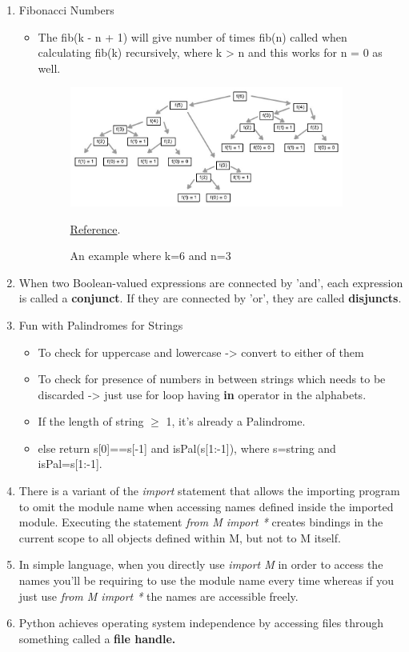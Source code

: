 \documentclass[11pt]{article}
\begin{document}
\begin{enumerate}
        \item Fibonacci Numbers
        \begin{itemize}
            \item The fib(k - n + 1) will give number of times fib(n) called when calculating fib(k) recursively, where k > n and this works for n = 0 as well.
            \begin{figure}[htp]
                \centering
                \includegraphics[width=9cm]{imgs/ex1.jpg}
                \caption{An example where k=6 and n=3} \href{https://stackoverflow.com/questions/63136225/how-many-times-does-fib3-gets-called-when-we-call-fib6-using-the-recursive-a}{Reference}.
                \label{fig:galaxy}
            \end{figure}
        \end{itemize}
        \item When two Boolean-valued expressions are connected by 'and', each expression is called a \textbf{conjunct}. If they are connected by 'or', they are called \textbf{disjuncts}.
        \item Fun with Palindromes for Strings
        \begin{itemize}
            \item To check for uppercase and lowercase -> convert to either of them
            \item To check for presence of numbers in between strings which needs to be discarded -> just use for loop having \textbf{in} operator in the alphabets.
            \item If the length of string $\geq$ 1, it's already a Palindrome.
            \item else return s[0]==s[-1] and isPal(s[1:-1]), where s=string and isPal=s[1:-1].
        \end{itemize}
        \item There is a variant of the \textit{import} statement that allows the importing program to omit the module name when accessing names defined inside the imported module. Executing the statement \textit{from M import *} creates bindings in the current scope to all objects defined within 
        M, but not to M itself. 
        \item In simple language, when you directly use \textit{import M} in order to access the names you'll be requiring to use the module name every time whereas if you just use \textit{from M import *} the names are accessible freely.
        \item Python achieves operating system independence by accessing files through something called a \textbf{file handle.}
    \end{enumerate}
\end{document}
